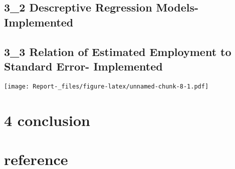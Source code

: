 \documentclass[
]{article}
\begin{document}
\hypertarget{descreptive-regression-models--implemented}{%
\subsection{3\_2 Descreptive Regression Models-
Implemented}\label{descreptive-regression-models--implemented}}

\hypertarget{relation-of-estimated-employment-to-standard-error--implemented}{%
\subsection{3\_3 Relation of Estimated Employment to Standard Error-
Implemented}\label{relation-of-estimated-employment-to-standard-error--implemented}}

\texttt{[image: Report-\_files/figure-latex/unnamed-chunk-8-1.pdf]}

\hypertarget{conclusion}{%
\section{4 conclusion}\label{conclusion}}

\hypertarget{reference}{%
\section{reference}\label{reference}}
\end{document}

